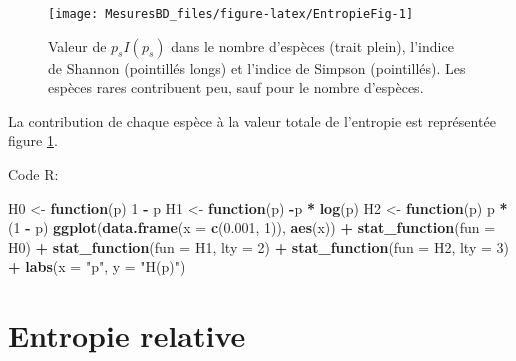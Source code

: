 \documentclass[
  11pt,
  french,
  a4paper,
  extrafontsizes,onecolumn,openright
  ]{memoir}
\newenvironment{Shaded}{\begin{snugshade}}{\end{snugshade}}
\newcommand{\AttributeTok}[1]{\textcolor[rgb]{0.13,0.29,0.53}{#1}}
\newcommand{\ControlFlowTok}[1]{\textcolor[rgb]{0.13,0.29,0.53}{\textbf{#1}}}
\newcommand{\DecValTok}[1]{\textcolor[rgb]{0.00,0.00,0.81}{#1}}
\newcommand{\FloatTok}[1]{\textcolor[rgb]{0.00,0.00,0.81}{#1}}
\newcommand{\FunctionTok}[1]{\textcolor[rgb]{0.13,0.29,0.53}{\textbf{#1}}}
\newcommand{\NormalTok}[1]{#1}
\newcommand{\OtherTok}[1]{\textcolor[rgb]{0.56,0.35,0.01}{#1}}
\newcommand{\SpecialCharTok}[1]{\textcolor[rgb]{0.81,0.36,0.00}{\textbf{#1}}}
\newcommand{\StringTok}[1]{\textcolor[rgb]{0.31,0.60,0.02}{#1}}
\begin{document}
\normalsize



\scriptsize

\begin{figure}

{\centering \texttt{[image: MesuresBD\_files/figure-latex/EntropieFig-1]} 

}

\caption{Valeur de \(p_{s}I(p_s)\) dans le nombre d'espèces (trait plein), l'indice de Shannon (pointillés longs) et l'indice de Simpson (pointillés). Les espèces rares contribuent peu, sauf pour le nombre d'espèces.}\label{fig:EntropieFig}
\end{figure}

\normalsize

La contribution de chaque espèce à la valeur totale de l'entropie est représentée figure \ref{fig:EntropieFig}.

Code R:

\scriptsize

\begin{Shaded}
\begin{Highlighting}[]
\NormalTok{H0 }\OtherTok{\textless{}{-}} \ControlFlowTok{function}\NormalTok{(p) }\DecValTok{1} \SpecialCharTok{{-}}\NormalTok{ p}
\NormalTok{H1 }\OtherTok{\textless{}{-}} \ControlFlowTok{function}\NormalTok{(p) }\SpecialCharTok{{-}}\NormalTok{p }\SpecialCharTok{*} \FunctionTok{log}\NormalTok{(p)}
\NormalTok{H2 }\OtherTok{\textless{}{-}} \ControlFlowTok{function}\NormalTok{(p) p }\SpecialCharTok{*}\NormalTok{ (}\DecValTok{1} \SpecialCharTok{{-}}\NormalTok{ p)}
\FunctionTok{ggplot}\NormalTok{(}\FunctionTok{data.frame}\NormalTok{(}\AttributeTok{x =} \FunctionTok{c}\NormalTok{(}\FloatTok{0.001}\NormalTok{, }\DecValTok{1}\NormalTok{)), }\FunctionTok{aes}\NormalTok{(x)) }\SpecialCharTok{+} \FunctionTok{stat\_function}\NormalTok{(}\AttributeTok{fun =}\NormalTok{ H0) }\SpecialCharTok{+}
    \FunctionTok{stat\_function}\NormalTok{(}\AttributeTok{fun =}\NormalTok{ H1, }\AttributeTok{lty =} \DecValTok{2}\NormalTok{) }\SpecialCharTok{+} \FunctionTok{stat\_function}\NormalTok{(}\AttributeTok{fun =}\NormalTok{ H2,}
    \AttributeTok{lty =} \DecValTok{3}\NormalTok{) }\SpecialCharTok{+} \FunctionTok{labs}\NormalTok{(}\AttributeTok{x =} \StringTok{"p"}\NormalTok{, }\AttributeTok{y =} \StringTok{"H(p)"}\NormalTok{)}
\end{Highlighting}
\end{Shaded}

\normalsize

\section{Entropie relative}\label{entropie-relative}
\end{document}
